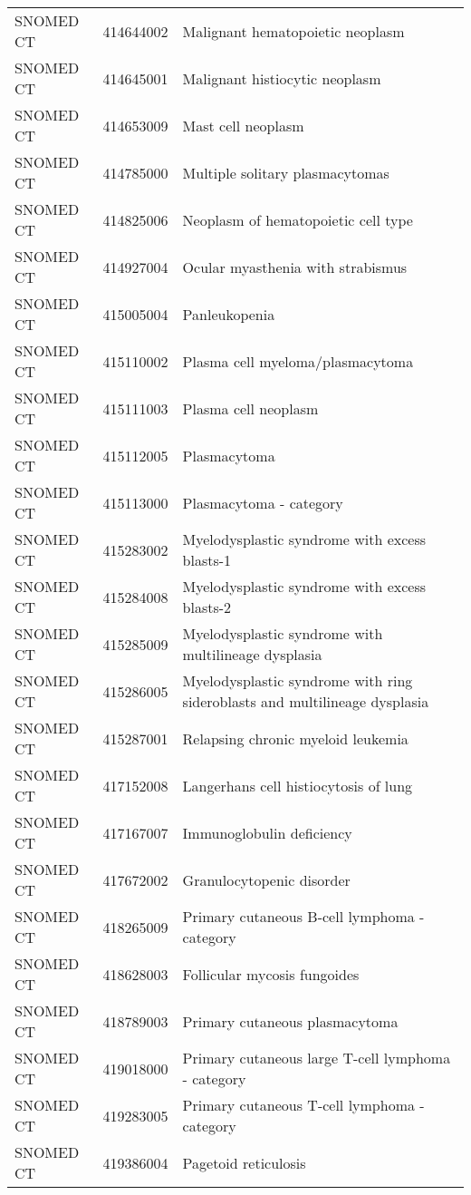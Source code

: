 \begin{longtable}{p{}p{}p{}}
  SNOMED CT & 414644002 & Malignant hematopoietic neoplasm \\ 
  SNOMED CT & 414645001 & Malignant histiocytic neoplasm \\ 
  SNOMED CT & 414653009 & Mast cell neoplasm \\ 
  SNOMED CT & 414785000 & Multiple solitary plasmacytomas \\ 
  SNOMED CT & 414825006 & Neoplasm of hematopoietic cell type \\ 
  SNOMED CT & 414927004 & Ocular myasthenia with strabismus \\ 
  SNOMED CT & 415005004 & Panleukopenia \\ 
  SNOMED CT & 415110002 & Plasma cell myeloma/plasmacytoma \\ 
  SNOMED CT & 415111003 & Plasma cell neoplasm \\ 
  SNOMED CT & 415112005 & Plasmacytoma \\ 
  SNOMED CT & 415113000 & Plasmacytoma - category \\ 
  SNOMED CT & 415283002 & Myelodysplastic syndrome with excess blasts-1 \\ 
  SNOMED CT & 415284008 & Myelodysplastic syndrome with excess blasts-2 \\ 
  SNOMED CT & 415285009 & Myelodysplastic syndrome with multilineage dysplasia \\ 
  SNOMED CT & 415286005 & Myelodysplastic syndrome with ring sideroblasts and multilineage dysplasia \\ 
  SNOMED CT & 415287001 & Relapsing chronic myeloid leukemia \\ 
  SNOMED CT & 417152008 & Langerhans cell histiocytosis of lung \\ 
  SNOMED CT & 417167007 & Immunoglobulin deficiency \\ 
  SNOMED CT & 417672002 & Granulocytopenic disorder \\ 
  SNOMED CT & 418265009 & Primary cutaneous B-cell lymphoma - category \\ 
  SNOMED CT & 418628003 & Follicular mycosis fungoides \\ 
  SNOMED CT & 418789003 & Primary cutaneous plasmacytoma \\ 
  SNOMED CT & 419018000 & Primary cutaneous large T-cell lymphoma - category \\ 
  SNOMED CT & 419283005 & Primary cutaneous T-cell lymphoma - category \\ 
  SNOMED CT & 419386004 & Pagetoid reticulosis \\ 

\end{longtable}
